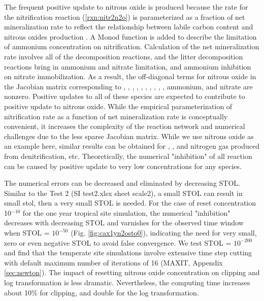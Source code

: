 \documentclass[gmd, manuscript]{copernicus}
\begin{document}
The frequent positive update to nitrous oxide is produced because the rate for the nitrification reaction (\ref{rxn:nitr2n2o}) is parameterized as a fraction of net mineralization rate to reflect the relationship between labile carbon content and nitrous oxides production \citep{Parton1996}. A Monod function is added to describe the limitation of ammonium concentration on nitrification. Calculation of the net mineralization rate involves all of the decomposition reactions, and the litter decomposition reactions bring in ammonium and nitrate limitation, and ammonium inhibition on nitrate immobilization. As a result, the off-diagonal terms for nitrous oxide in the Jacobian matrix corresponding to , , , , , , , , , , ammonium, and nitrate are nonzero. Positive updates to all of these species are expected to contribute to positive update to nitrous oxide. While the empirical parameterization of nitrification rate as a function of net mineralization rate is conceptually convenient, it increases the complexity of the reaction network and numerical challenges due to the less sparse Jacobian matrix. While we use nitrous oxide as an example here, similar results can be obtained for , , and nitrogen gas produced from denitrification, etc. Theoretically, the numerical "inhibition" of all reaction can be caused by positive update to very low concentrations for any species. 

The numerical errors can be decreased and eliminated by decreasing STOL. Similar to the Test 2 (SI test2.xlsx sheet scale2), a small STOL can result in small stol, then a very small STOL is needed. For the case of reset concentration 10$^{-10}$ for the one year tropical site simulation, the numerical "inhibition" decreases with decreasing STOL and varnishes for the observed time window when STOL = $10^{-50}$ (Fig. \ref{fig:cax1yn2osto0}), indicating the need for very small, zero or even negative STOL to avoid false convergence. We test STOL = $10^{-200}$ and find that the temperate site simulations involve extensive time step cutting with default maximum number of iterations of 16 (MAXIT, Appendix \ref{sec:newton}). The impact of resetting nitrous oxide concentration on clipping and log transformation is less dramatic. Nevertheless, the computing time increases about 10\% for clipping, and double for the log transformation.  

\end{document}
